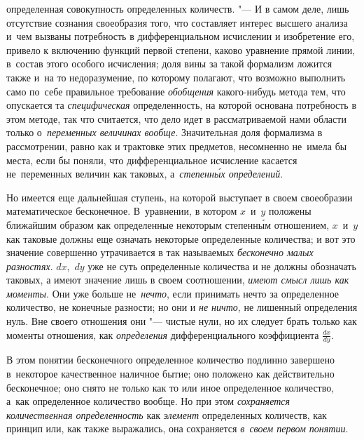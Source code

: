 определенная совокупность определенных количеств. "--- И в самом деле, лишь
отсутствие сознания своеобразия того, что составляет интерес высшего анализа
и~чем вызваны потребность в дифференциальном исчислении и изобретение его,
привело к включению функций первой степени, каково уравнение прямой линии,
в~состав этого особого исчисления; доля вины за такой формализм ложится также
и~на то недоразумение, по которому полагают, что возможно выполнить само
по~себе правильное требование {\em обобщения} какого-нибудь метода тем, что
опускается та {\em специфическая} определенность, на которой основана
потребность в этом методе, так что считается, что дело идет в рассматриваемой
нами области только о~{\em переменных величинах вообще}. Значительная доля
формализма в рассмотрении, равно как и трактовке этих предметов, несомненно
не~имела бы места, если бы поняли, что дифференциальное исчисление касается
не~переменных величин как таковых, а~{\em степенн\'{ы}х определений}.

Но имеется еще дальнейшая ступень, на которой выступает в своем своеобразии
математическое бесконечное. В~уравнении, в котором $x$~и~$y$ положены ближайшим
образом как определенные некоторым степенн\'{ы}м отношением, $x$~и~$y$ как
таковые должны еще означать некоторые определенные количества; и вот это
значение совершенно утрачивается в так называемых
{\em бесконечно малых разностях}. $dx$,~$dy$ уже не суть определенные
количества и не должны обозначать таковых, а имеют значение лишь в своем
соотношении, {\em имеют смысл лишь как моменты}. Они уже больше
не~{\em нечто}, если принимать нечто за определенное количество, не конечные
разности; но они и {\em не ничто}, не лишенный определения нуль. Вне своего
отношения они "--- чистые нули, но их следует брать только как моменты
отношения, как {\em определения} дифференциального
коэффициента $\frac{dx}{dy}$.

В этом понятии бесконечного определенное количество подлинно завершено
в~некоторое качественное наличное бытие; оно положено как действительно
бесконечное; оно снято не только как то или иное определенное количество,
а~как определенное количество вообще. Но при этом
{\em сохраняется количественная определенность} как {\em элемент}
определенных количеств, как принцип или, как также выражались,
она сохраняется {\em в~своем первом понятии}.

